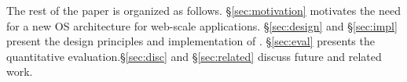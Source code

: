







 The rest of the paper is 
organized as follows. \S \ref{sec:motivation} motivates the need
for a new OS architecture for web-scale applications. \S\ref{sec:design} and \S\ref{sec:impl} present the design principles and
implementation of \ix. \S\ref{sec:eval} presents the
quantitative evaluation.\S\ref{sec:disc} and \S\ref{sec:related} discuss future and related work.







